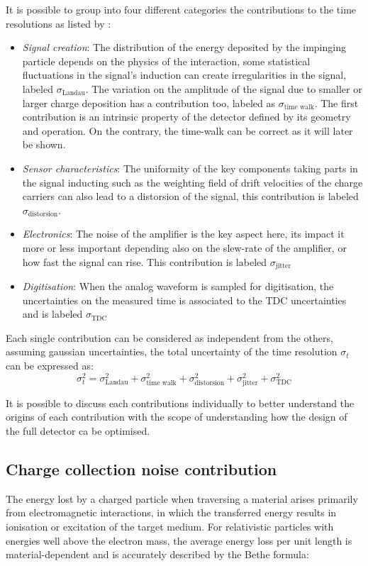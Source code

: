 	It is possible to group into four different categories the contributions to the time resolutions as listed by \cite{timeres_SiliconDetectors}:
	\begin{itemize}
		\item \textit{Signal creation}: The distribution of the energy deposited by the impinging particle depends on the physics of the interaction, some statistical fluctuations in the signal's induction can create irregularities in the signal, labeled $\sigma_{\text{Landau}}$. The variation on the amplitude of the signal due to smaller or larger charge deposition has a contribution too, labeled as $\sigma_{\text{time walk}}$. The first contribution is an intrinsic property of the detector defined by its geometry and operation. On the contrary, the time-walk can be correct as it will later be shown.
		\item \textit{Sensor characteristics}: The uniformity of the key components taking parts in the signal inducting such as the weighting field of drift velocities of the charge carriers can also lead to a distorsion of the signal, this contribution is labeled $\sigma_{\text{distorsion}}$.
		\item \textit{Electronics}: The noise of the amplifier is the key aspect here, its impact it more or less important depending also on the slew-rate of the amplifier, or how fast the signal can rise. This contribution is labeled $\sigma_{\text{jitter}}$
		\item \textit{Digitisation}: When the analog waveform is sampled for digitisation, the uncertainties on the measured time is associated to the TDC uncertainties and is labeled $\sigma_{\text{TDC}}$
	\end{itemize} 
	
	Each single contribution can be considered as independent from the others, assuming gaussian uncertainties, the total uncertainty of the time resolution $\sigma_t$ can be expressed as: 
	\begin{equation}
		\sigma_t^2 = \sigma_{\text{Landau}}^2 + \sigma_{\text{time walk}}^2 + \sigma_{\text{distorsion}}^2 + \sigma_{\text{jitter}}^2 + \sigma_{\text{TDC}}^2
	\end{equation}
	
	It is possible to discuss each contributions individually to better understand the origins of each contribution with the scope of understanding how the design of the full detector ca be optimised. 
	
	 	\subsection{Charge collection noise contribution}
	 	The energy lost by a charged particle when traversing a material arises primarily from electromagnetic interactions, in which the transferred energy results in ionisation or excitation of the target medium. For relativistic particles with energies well above the electron mass, the average energy loss per unit length is material-dependent and is accurately described by the Bethe formula:

